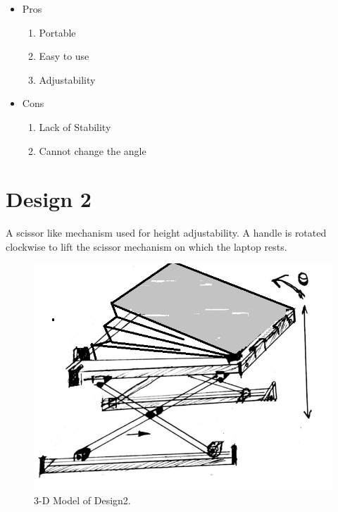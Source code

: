\begin{itemize}
 \item Pros
 \begin{enumerate}
	\item Portable
    \item Easy to use
    \item Adjustability
 \end{enumerate}
 \item Cons
 \begin{enumerate}
	\item Lack of Stability
    \item Cannot change the angle
 \end{enumerate}
\end{itemize}



\section{Design 2}

A scissor like mechanism used for height adjustability. A handle is rotated clockwise to lift the scissor mechanism on which the laptop rests\cite{american_manf}.

\begin{figure}
  \includegraphics[width=\linewidth]{design2}
  \caption{3-D Model of Design2.}
  \label{fig:Design2}
\end{figure}


